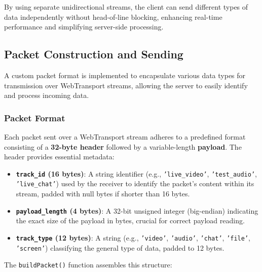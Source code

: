 By using separate unidirectional streams, the client can send different types of data independently without head-of-line blocking, enhancing real-time performance and simplifying server-side processing.

\subsection{Packet Construction and Sending}
A custom packet format is implemented to encapsulate various data types for transmission over WebTransport streams, allowing the server to easily identify and process incoming data.

\subsubsection{Packet Format}
Each packet sent over a WebTransport stream adheres to a predefined format consisting of a \textbf{32-byte header} followed by a variable-length \textbf{payload}. The header provides essential metadata:

\begin{itemize}
    \item \textbf{\texttt{track\_id} (16 bytes)}: A string identifier (e.g., \texttt{'live\_video'}, \texttt{'test\_audio'}, \texttt{'live\_chat'}) used by the receiver to identify the packet's content within its stream, padded with null bytes if shorter than 16 bytes.
    \item \textbf{\texttt{payload\_length} (4 bytes)}: A 32-bit unsigned integer (big-endian) indicating the exact size of the payload in bytes, crucial for correct payload reading.
    \item \textbf{\texttt{track\_type} (12 bytes)}: A string (e.g., \texttt{'video'}, \texttt{'audio'}, \texttt{'chat'}, \texttt{'file'}, \texttt{'screen'}) classifying the general type of data, padded to 12 bytes.
\end{itemize}

The \texttt{buildPacket()} function assembles this structure:

